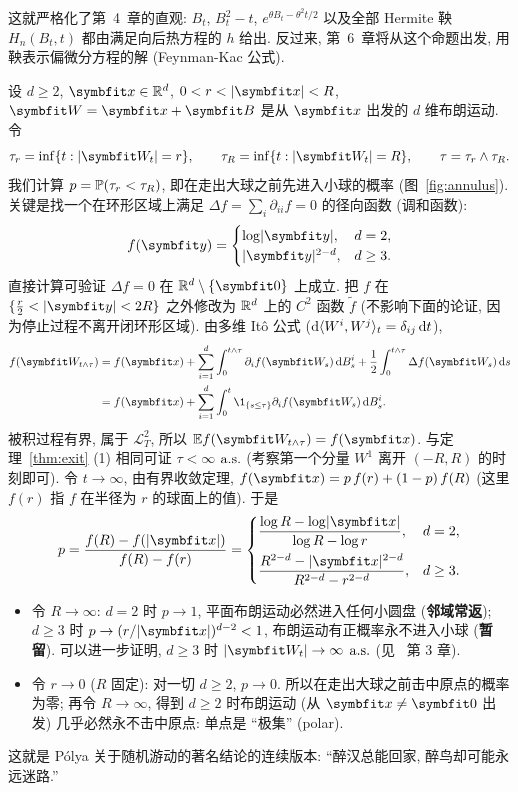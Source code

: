 这就严格化了第~4~章的直观: $B_t$, $B_t^2-t$, $e^{\theta B_t-\theta^2t/2}$ 以及全部 Hermite 鞅 $H_n(B_t,t)$ 都由满足向后热方程的 $h$ 给出. 反过来, 第~6~章将从这个命题出发, 用鞅表示偏微分方程的解 (Feynman-Kac 公式).

\begin{example}[多维布朗运动的常返与暂留]\label{ex:bm-annulus}
设 $d\ge2$, $\rvec{x}\in\R^d$, $0<r<\abs{\rvec{x}}<R$, $\rvec{W}=\rvec{x}+\rvec{B}$ 是从 $\rvec{x}$ 出发的 $d$ 维布朗运动. 令
\[
\tau_r=\inf\{t:\abs{\rvec{W}_t}=r\},\qquad\tau_R=\inf\{t:\abs{\rvec{W}_t}=R\},\qquad\tau=\tau_r\wedge\tau_R.
\]
我们计算 $p=\P(\tau_r<\tau_R)$, 即在走出大球之前先进入小球的概率 (图~\ref{fig:annulus}). 关键是找一个在环形区域上满足 $\Delta f=\sum_i\partial_{ii}f=0$ 的径向函数 (调和函数):
\[
f(\rvec{y})=\begin{cases}\log\abs{\rvec{y}},&d=2,\\ \abs{\rvec{y}}^{2-d},&d\ge3.\end{cases}
\]
直接计算可验证 $\Delta f=0$ 在 $\R^d\setminus\{\rvec{0}\}$ 上成立. 把 $f$ 在 $\{\frac{r}{2}<\abs{\rvec{y}}<2R\}$ 之外修改为 $\R^d$ 上的 $C^2$ 函数 $\tilde{f}$ (不影响下面的论证, 因为停止过程不离开闭环形区域). 由多维 It\^o 公式 ($\dd\ip{W^i,W^j}_t=\delta_{ij}\dd t$),
\begin{align*}
f(\rvec{W}_{t\wedge\tau})&=f(\rvec{x})+\sum_{i=1}^d\int_0^{t\wedge\tau}\partial_if(\rvec{W}_s)\dd B^i_s+\frac{1}{2}\int_0^{t\wedge\tau}\Delta f(\rvec{W}_s)\dd s\\
&=f(\rvec{x})+\sum_{i=1}^d\int_0^t\1_{\{s\le\tau\}}\partial_if(\rvec{W}_s)\dd B^i_s.
\end{align*}
被积过程有界, 属于 $\mathscr{L}^2_T$, 所以 $\E f(\rvec{W}_{t\wedge\tau})=f(\rvec{x})$. 与定理~\ref{thm:exit} (1) 相同可证 $\tau<\infty$ $\as$ (考察第一个分量 $W^1$ 离开 $(-R,R)$ 的时刻即可). 令 $t\to\infty$, 由有界收敛定理, $f(\rvec{x})=p\,f(r)+(1-p)\,f(R)$ (这里 $f(r)$ 指 $f$ 在半径为 $r$ 的球面上的值). 于是
\[
p=\frac{f(R)-f(\abs{\rvec{x}})}{f(R)-f(r)}=\begin{cases}\dfrac{\log R-\log\abs{\rvec{x}}}{\log R-\log r},&d=2,\\[2ex]\dfrac{R^{2-d}-\abs{\rvec{x}}^{2-d}}{R^{2-d}-r^{2-d}},&d\ge3.\end{cases}
\]
\begin{itemize}
\item 令 $R\to\infty$: $d=2$ 时 $p\to1$, 平面布朗运动必然进入任何小圆盘 (\textbf{邻域常返}); $d\ge3$ 时 $p\to(r/\abs{\rvec{x}})^{d-2}<1$, 布朗运动有正概率永不进入小球 (\textbf{暂留}). 可以进一步证明, $d\ge3$ 时 $\abs{\rvec{W}_t}\to\infty$ $\as$ (见~\cite{morters} 第 3 章).
\item 令 $r\to0$ ($R$ 固定): 对一切 $d\ge2$, $p\to0$. 所以在走出大球之前击中原点的概率为零; 再令 $R\to\infty$, 得到 $d\ge2$ 时布朗运动 (从 $\rvec{x}\ne\rvec{0}$ 出发) 几乎必然永不击中原点: 单点是 ``极集'' (polar).
\end{itemize}
这就是 P\'olya 关于随机游动的著名结论的连续版本: ``醉汉总能回家, 醉鸟却可能永远迷路.''
\end{example}

